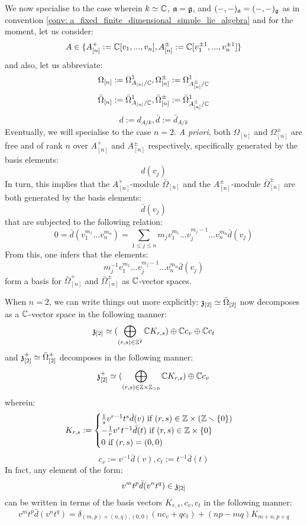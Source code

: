 \begin{remark}
            We now specialise to the case wherein $k \simeq \mathbb{C}$, $\mathfrak{a} = \mathfrak{g}$, and $(-, -)_{\mathfrak{a}} = (-, -)_{\mathfrak{g}}$ as in convention \ref{conv: a_fixed_finite_dimensional_simple_lie_algebra} and for the moment, let us consider:
                $$A \in \{ A_{[n]}^+ := \mathbb{C}[v_1, ..., v_n], A_{[n]}^{\pm} := \mathbb{C}[v_1^{\pm 1}, ..., v_n^{\pm 1}] \}$$
            and also, let us abbreviate:
                $$\Omega_{[n]} := \Omega^1_{A_{[n]}/\mathbb{C}}, \Omega^{\pm}_{[n]} := \Omega^1_{A_{[n]}^{\pm}/\mathbb{C}}$$
                $$\bar{\Omega}_{[n]} := \bar{\Omega}^1_{A_{[n]}/\mathbb{C}}, \bar{\Omega}_{[n]}^{\pm} := \bar{\Omega}^1_{A_{[n]}^{\pm}/\mathbb{C}}$$
                $$d := d_{A/k}, \bar{d} := \bar{d}_{A/k}$$
            Eventually, we will specialise to the case $n = 2$. \textit{A priori}, both $\Omega_{[n]}$ and $\Omega^{\pm}_{[n]}$ are free and of rank $n$ over $A_{[n]}^+$ and $A_{[n]}^{\pm}$ respectively, specifically generated by the basis elements:
                $$d(v_j)$$
            In turn, this implies that the $A_{[n]}^+$-module $\bar{\Omega}_{[n]}$ and the $A_{[n]}^{\pm}$-module $\bar{\Omega}_{[n]}^{\pm}$ are both generated by the basis elements:
                $$\bar{d}(v_j)$$
            that are subjected to the following relation:
                $$0 = \bar{d}( v_1^{m_1} ... v_n^{m_n} ) = \sum_{1 \leq j \leq n} m_j v_1^{m_1} ... v_j^{m_j - 1} ... v_n^{m_n} \bar{d}(v_j)$$
            From this, one infers that the elements:
                $$m_j^{-1} v_1^{m_1} ... v_j^{m_j - 1} ... v_n^{m_n} \bar{d}(v_j)$$
            form a basis for $\bar{\Omega}^+_{[n]}$ and $\bar{\Omega}_{[n]}^{\pm}$ as $\mathbb{C}$-vector spaces. 

            When $n = 2$, we can write things out more explicitly: $\mathfrak{z}_{[2]} \simeq \bar{\Omega}_{[2]}$ now decomposes as a $\mathbb{C}$-vector space in the following manner:
                $$\mathfrak{z}_{[2]} \simeq ( \bigoplus_{(r, s) \in \mathbb{Z}^2} \mathbb{C} K_{r, s}) \oplus \mathbb{C} c_v \oplus \mathbb{C} c_t$$
            and $\mathfrak{z}_{[2]}^+ \simeq \bar{\Omega}_{[2]}^+$ decomposes in the following manner:
                $$\z_{[2]}^+ \cong ( \bigoplus_{(r, s) \in \Z \x \Z_{> 0}} \bbC K_{r, s}) \oplus \bbC c_v$$
            wherein:
                $$
                    K_{r, s} :=
                    \begin{cases}
                        \text{$\frac1s v^{r - 1} t^s \bar{d}(v)$ if $(r, s) \in \Z \x (\Z \setminus \{0\})$}
                        \\
                        \text{$-\frac1r v^r t^{-1} \bar{d}(t)$ if $(r, s) \in \Z \x \{0\}$}
                        \\
                        \text{$0$ if $(r, s) = (0, 0)$}
                    \end{cases}
                $$
                $$c_v := v^{-1} \bar{d}(v), c_t := t^{-1} \bar{d}(t)$$
            In fact, any element of the form:
                $$v^m t^p \bar{d}(v^n t^q) \in \mathfrak{z}_{[2]}$$
            can be written in terms of the basis vectors $K_{r, s}, c_v, c_t$ in the following manner:
                $$v^m t^p \bar{d}(v^n t^q) = \delta_{(m, p) + (n, q), (0, 0)} ( n c_v + q c_t ) + (np - mq) K_{m + n, p + q}$$


\end{remark}
